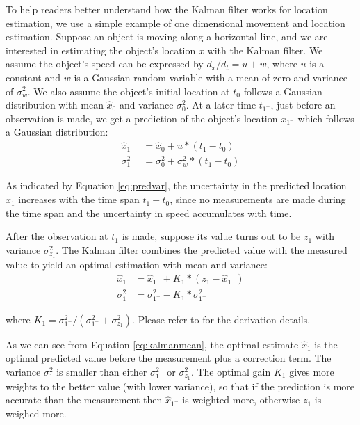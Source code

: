 \documentclass[12pt]{report}
\begin{document}
To help readers better understand how the Kalman filter works for
location estimation, we use a simple example of one dimensional
movement and location estimation.  Suppose an object is moving
along a horizontal line, and we are interested in estimating the
object's location \(x\) with the Kalman filter.  We assume the
object's speed can be expressed by \(d_x/d_t = u + w\), where \(u\)
is a constant and \(w\) is a Gaussian random variable with a mean
of zero and variance of \(\sigma_w^2\).  We also assume the
object's initial location at \(t_0\) follows a Gaussian
distribution with mean \(\hat{x}_0\) and variance \(\sigma^2_0\).
At a later time \(t_{1^-}\), just before an observation is made, we
get a prediction of the object's location \(x_{1^-}\) which follows
a Gaussian distribution:
\begin{align}
  \hat{x}_{1^-} &= \hat{x}_0+u*(t_1-t_0) \label{eq:predmean}\\
  \sigma_{1^-}^2 &= \sigma_0^2+\sigma_w^2*(t_1-t_0) \label{eq:predvar}
\end{align}

As indicated by Equation \eqref{eq:predvar}, the uncertainty in the
predicted location \(x_1\) increases with the time span \(t_1 -
   t_0\), since no measurements are made during the time span and the
uncertainty in speed accumulates with time.

After the observation at \(t_1\) is made, suppose its value turns
out to be \(z_1\) with variance \(\sigma_{z_1}^2\).  The Kalman
filter combines the predicted value with the measured value to
yield an optimal estimation with mean and variance:
\begin{align}
  \hat{x}_{1} &= \hat{x}_{1^-}+K_1*(z_1-\hat{x}_{1^-})\label{eq:kalmanmean}\\
  \sigma_{1}^2 &= \sigma_{1^-}^2-K_1*\sigma_{1^-}^2\label{eq:kalmanvar}
\end{align}

where \(K_1=\sigma_{1^-}^2/(\sigma_{1^-}^2+\sigma_{z_1}^2)\).
Please refer to \cite{maybeck1979-stochastic} for the derivation
details.

As we can see from Equation \eqref{eq:kalmanmean}, the optimal
estimate \(\hat{x}_{1}\) is the optimal predicted value before the
measurement plus a correction term.  The variance \(\sigma_{1}^2\)
is smaller than either \(\sigma_{1^-}^2\) or \(\sigma_{z_1}^2\).
The optimal gain \(K_1\) gives more weights to the better value
(with lower variance), so that if the prediction is more accurate
than the measurement then \(\hat{x}_{1^-}\) is weighted more,
otherwise \(z_1\) is weighed more.
\end{document}
